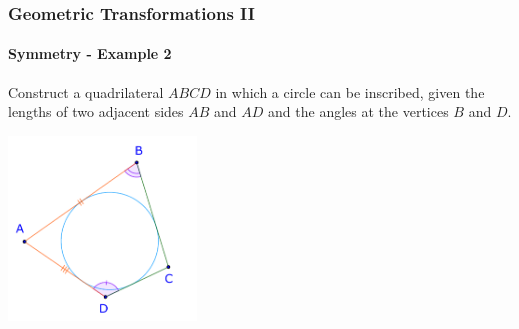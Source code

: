 \documentclass[8pt,xcolor=table,dvipsnames]{beamer}
\begin{document}
\begin{frame}[t]
    \frametitle{Geometric Transformations II}
    \framesubtitle{Symmetry - Example 2}
    \begin{example}
        Construct a quadrilateral $ABCD$ in which a circle can be inscribed,
        given the lengths of two adjacent sides $AB$ and $AD$ and the angles at the vertices $B$ and $D.$
    \end{example}

    \begin{center}
        \includegraphics[width=5cm]{./svg/pdf/symmetry-2a.pdf}
    \end{center}
\end{frame}
\end{document}
